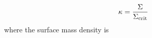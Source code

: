 \begin{equation}
\kappa = \frac{\Sigma}{\Sigma_{\rm{crit}}}
\end{equation}
where the surface mass density is